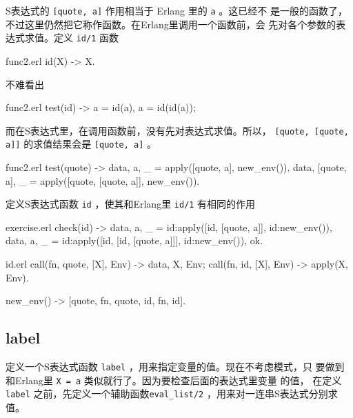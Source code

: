 \documentclass[preview,multi,crop=false,border=1in,class=memoir]{standalone}
\begin{document}
\begin{preview-page}
S表达式的 \verb|[quote, a]| 作用相当于 Erlang 里的 \verb|a| 。这已经不
是一般的函数了，不过这里仍然把它称作函数。在Erlang里调用一个函数前，会
先对各个参数的表达式求值。定义 \verb|id/1| 函数

\begin{SourceCode}[32][33]{func2.erl}
id(X) ->
    X.
\end{SourceCode}

不难看出

\begin{SourceCode}[36][38]{func2.erl}
test(id) ->
    a = id(a),
    a = id(id(a));
\end{SourceCode}

而在S表达式里，在调用函数前，没有先对表达式求值。所以，
\verb|[quote, [quote, a]]| 的求值结果会是 \verb|[quote, a]| 。

\begin{SourceCode}[39][43]{func2.erl}
test(quote) ->
    {{data, a}, _} =
        apply([quote, a], new_env()),
    {{data, [quote, a]}, _} =
        apply([quote, [quote, a]], new_env()).
\end{SourceCode}


\begin{Exercise}[title={id},difficulty=1]
定义S表达式函数 \verb|id| ，使其和Erlang里 \verb|id/1| 有相同的作用

\begin{SourceCode}[21][26]{exercise.erl}
check(id) ->
    {{data, a}, _} =
        id:apply([id, [quote, a]], id:new_env()),
    {{data, a}, _} =
        id:apply([id, [id, [quote, a]]], id:new_env()),
    ok.
\end{SourceCode}

\end{Exercise}

\begin{Answer}
\begin{SourceCode}[24]{id.erl}
call({fn, quote}, [X], Env) ->
    {{data, X}, Env};
call({fn, id}, [X], Env) ->
    apply(X, Env).


new_env() ->
    [{quote, {fn, quote}},
     {id,    {fn, id}}].
\end{SourceCode}
\end{Answer}


\subsection{label}

定义一个S表达式函数 \verb|label| ，用来指定变量的值。现在不考虑模式，只
要做到和Erlang里 \verb|X = a| 类似就行了。因为要检查后面的表达式里变量
的值， 在定义 \verb|label| 之前，先定义一个辅助函数\verb|eval_list/2|
，用来对一连串S表达式分别求值。


\end{preview-page}
\end{document}
